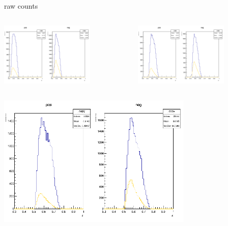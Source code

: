 \begin{frame}{raw counts}
\begin{columns}
\begin{column}[T]{0.5\textwidth}
\includegraphics[width = 0.7\textwidth]{results/yield/statistics/counts_x_Q2_z_0.50_5.500_0.40.png}
\end{column}
\begin{column}[T]{0.5\textwidth}
\includegraphics[width = 0.7\textwidth]{results/yield/statistics/counts_x_Q2_z_0.50_5.500_0.50.png}
\end{column}
\end{columns}
\begin{columns}
\begin{column}[T]{0.5\textwidth}
\includegraphics[width = 0.7\textwidth]{results/yield/statistics/counts_x_Q2_z_0.50_5.500_0.60.png}

\end{column}
\end{columns}
\end{frame}
